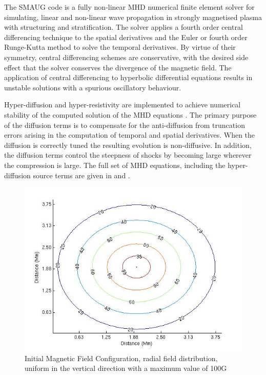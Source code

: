 \documentclass[twocolumn]{aastex62}
\begin{document}
The SMAUG code is a fully non-linear MHD numerical finite element solver for simulating, linear and non-linear wave propagation in strongly magnetised plasma with structuring and stratification. The solver applies a fourth order central differencing technique to the spatial derivatives and the Euler or fourth order Runge-Kutta method to solve the temporal derivatives. By virtue of their symmetry, central differencing schemes are conservative, with the desired side effect that the solver conserves the divergence of the magnetic field. The application of central differencing to hyperbolic differential equations results in unstable solutions with a spurious oscillatory behaviour.

Hyper-diffusion and hyper-resistivity are implemented to achieve numerical stability of the computed solution of the MHD equations \citep[see for example][]{Caunt2001}. The primary purpose of the diffusion terms is to compensate for the anti-diffusion from truncation errors arising in the computation of temporal and spatial derivatives. When the diffusion is correctly tuned the resulting evolution is non-diffusive. In addition, the diffusion terms control the steepness of shocks by becoming large wherever the compression is large. The full set of MHD equations, including the hyper-diffusion source terms are given in \citet{Griffiths2015} and \citet{Shelyag2008}.

\begin{figure}[h]\label{inimagfieldplot}
\centering
\includegraphics[scale=0.475]{imrescale/bfield100G.jpg}
\caption{Initial Magnetic Field Configuration, radial field distribution, uniform in the vertical direction with a maximum value of 100G }
\end{figure}
\end{document}
